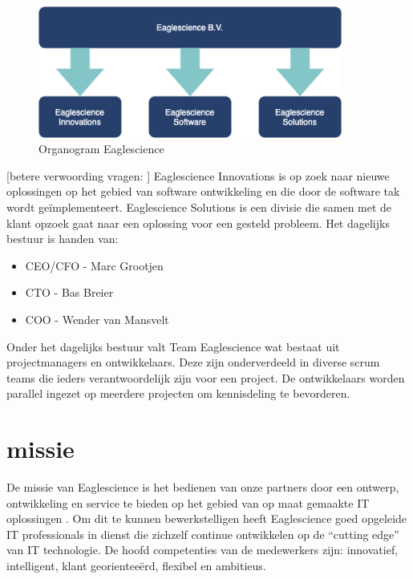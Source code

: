 \begin{figure}[bth]
\myfloatalign
\includegraphics[width=10cm]{gfx/organogram}
\caption{Organogram Eaglescience}
\label{fig:Eaglescience organogram}
\end{figure}
[betere verwoording vragen: ]
Eaglescience Innovations is op zoek naar nieuwe oplossingen op het gebied van software ontwikkeling en  die door de software tak wordt ge\"implementeert. Eaglescience Solutions is een divisie die samen met de klant opzoek gaat naar
een oplossing voor een gesteld probleem.
Het dagelijks bestuur is handen van:
\begin{itemize}
\item CEO/CFO - Marc Grootjen
\item CTO - Bas Breier
\item COO - Wender van Mansvelt \\
\end{itemize}
Onder het dagelijks bestuur valt Team Eaglescience wat bestaat uit projectmanagers en ontwikkelaars. Deze zijn onderverdeeld in diverse scrum teams die ieders verantwoordelijk zijn voor een project. De ontwikkelaars worden parallel ingezet op meerdere projecten om kennisdeling te bevorderen.

\section{missie}
De missie van Eaglescience is het bedienen van onze partners door een ontwerp, ontwikkeling en service te bieden op het gebied van op maat gemaakte IT oplossingen . Om dit te kunnen bewerkstelligen heeft Eaglescience goed opgeleide IT professionals in dienst die zichzelf continue ontwikkelen op de “cutting edge” van IT technologie. De hoofd competenties van de medewerkers zijn: innovatief, intelligent, klant georientee\"erd, flexibel en ambitieus.

